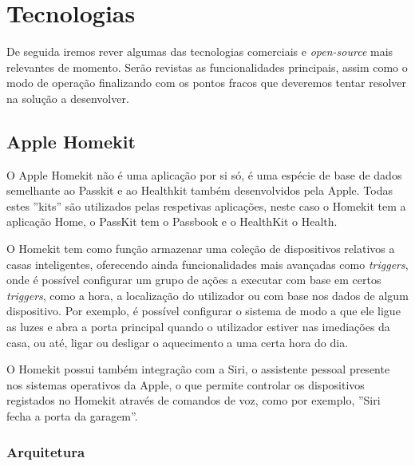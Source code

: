 \section{Tecnologias}

De seguida iremos rever algumas das tecnologias comerciais e \textit{open-source} mais relevantes de momento. Serão revistas as funcionalidades principais, assim como o modo de operação finalizando com os pontos fracos que deveremos tentar resolver na solução a desenvolver.

\subsection{Apple Homekit}

O Apple Homekit não é uma aplicação por si só, é uma espécie de base de dados semelhante ao Passkit e ao Healthkit também desenvolvidos pela Apple. Todas estes ''kits'' são utilizados pelas respetivas aplicações, neste caso o Homekit tem a aplicação Home, o PassKit tem o Passbook e o HealthKit o Health.

O Homekit tem como função armazenar uma coleção de dispositivos relativos a casas inteligentes, oferecendo ainda funcionalidades mais avançadas como \textit{triggers}, onde é possível configurar um grupo de ações a executar com base em certos \textit{triggers}, como a hora, a localização do utilizador ou com base nos dados de algum dispositivo. Por exemplo, é possível configurar o sistema de modo a que ele ligue as luzes e abra a porta principal quando o utilizador estiver nas imediações da casa, ou até, ligar ou desligar o aquecimento a uma certa hora do dia.

O Homekit possui também integração com a Siri, o assistente pessoal presente nos sistemas operativos da Apple, o que permite controlar os dispositivos registados no Homekit através de comandos de voz, como por exemplo, ''Siri fecha a porta da garagem''.

\subsubsection{Arquitetura}

